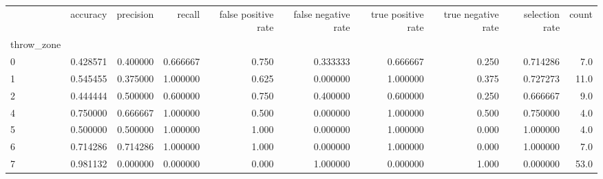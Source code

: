 \begin{tabular}{lrrrrrrrrr}
\toprule
{} &  accuracy &  precision &    recall &  false positive rate &  false negative rate &  true positive rate &  true negative rate &  selection rate &  count \\
throw\_zone &           &            &           &                      &                      &                     &                     &                 &        \\
\midrule
0          &  0.428571 &   0.400000 &  0.666667 &                0.750 &             0.333333 &            0.666667 &               0.250 &        0.714286 &    7.0 \\
1          &  0.545455 &   0.375000 &  1.000000 &                0.625 &             0.000000 &            1.000000 &               0.375 &        0.727273 &   11.0 \\
2          &  0.444444 &   0.500000 &  0.600000 &                0.750 &             0.400000 &            0.600000 &               0.250 &        0.666667 &    9.0 \\
4          &  0.750000 &   0.666667 &  1.000000 &                0.500 &             0.000000 &            1.000000 &               0.500 &        0.750000 &    4.0 \\
5          &  0.500000 &   0.500000 &  1.000000 &                1.000 &             0.000000 &            1.000000 &               0.000 &        1.000000 &    4.0 \\
6          &  0.714286 &   0.714286 &  1.000000 &                1.000 &             0.000000 &            1.000000 &               0.000 &        1.000000 &    7.0 \\
7          &  0.981132 &   0.000000 &  0.000000 &                0.000 &             1.000000 &            0.000000 &               1.000 &        0.000000 &   53.0 \\
\bottomrule
\end{tabular}
